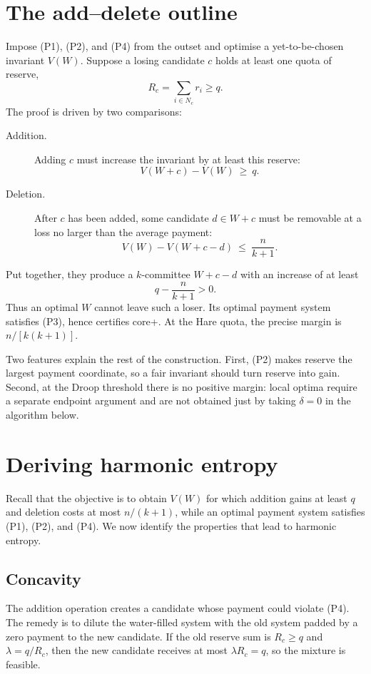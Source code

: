 \documentclass[11pt,a4paper]{article}
\theoremstyle{definition}
\theoremstyle{remark}
\begin{document}
\section{The add--delete outline}
Impose (P1), (P2), and (P4) from the outset and optimise a yet-to-be-chosen invariant $V(W)$. Suppose a losing candidate $c$ holds at least one quota of reserve,
\[
R_c=\sum_{i\in N_c}r_i\ge q.
\]
The proof is driven by two comparisons:
\begin{description}
\item[Addition.] Adding $c$ must increase the invariant by at least this reserve:
\[
V(W+c)-V(W)\ \ge\ q.
\]
\item[Deletion.] After $c$ has been added, some candidate $d\in W+c$ must be removable at a loss no larger than the average payment:
\[
V(W)-V(W+c-d)\ \le\ \frac n{k+1}.
\]
\end{description}
Put together, they produce a $k$-committee $W+c-d$ with an increase of at least
\[
q-\frac n{k+1}>0.
\]
Thus an optimal $W$ cannot leave such a loser. Its optimal payment system satisfies (P3), hence certifies core+. At the Hare quota, the precise margin is $n/[k(k+1)]$.

Two features explain the rest of the construction. First, (P2) makes reserve the largest payment coordinate, so a fair invariant should turn reserve into gain. Second, at the Droop threshold there is no positive margin: local optima require a separate endpoint argument and are not obtained just by taking $\delta=0$ in the algorithm below.

\section{Deriving harmonic entropy}
Recall that the objective is to obtain $V(W)$ for which addition gains at least $q$ and deletion costs at most $n/(k+1)$, while an optimal payment system satisfies (P1), (P2), and (P4). We now identify the properties that lead to harmonic entropy.

\subsection{Concavity}
The addition operation creates a candidate whose payment could violate (P4). The remedy is to dilute the water-filled system with the old system padded by a zero payment to the new candidate. If the old reserve sum is $R_c\ge q$ and $\lambda=q/R_c$, then the new candidate receives at most $\lambda R_c=q$, so the mixture is feasible.
\end{document}
